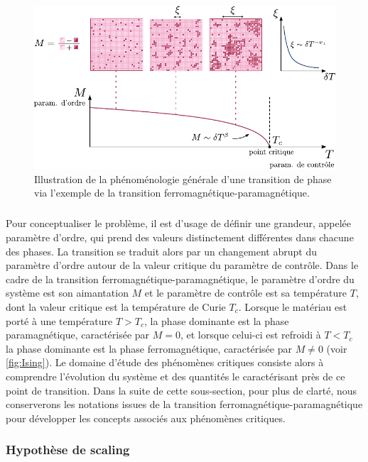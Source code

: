 \begin{figure}[h]
	\centering
	\includegraphics[width=\textwidth]{Chapitre1/Figures/PhenomenesCritiques/PT_conceptCorrLength_fuse.pdf}
	\caption{Illustration de la phénoménologie générale d'une transition de phase via l'exemple de la transition ferromagnétique-paramagnétique.}
	\label{fig:Ising}
\end{figure}

\subparagraph{}Pour conceptualiser le problème, il est d'usage de définir une grandeur, appelée paramètre d'ordre, qui prend des valeurs distinctement différentes dans chacune des phases. La transition se traduit alors par un changement abrupt du paramètre d'ordre autour de la valeur critique du paramètre de contrôle. Dans le cadre de la transition ferromagnétique-paramagnétique, le paramètre d'ordre du système est son aimantation $M$ et le paramètre de contrôle est sa température $T$, dont la valeur critique est la température de Curie $T_c$. Lorsque le matériau est porté à une température $T>T_c$, la phase dominante est la phase paramagnétique, caractérisée par $M=0$, et lorsque celui-ci est refroidi à $T<T_c$ la phase dominante est la phase ferromagnétique, caractérisée par $M\neq 0$ (voir \autoref{fig:Ising}). Le domaine d'étude des phénomènes critiques consiste alors à comprendre l'évolution du système et des quantités le caractérisant près de ce point de transition. Dans la suite de cette sous-section, pour plus de clarté, nous conserverons les notations issues de la transition ferromagnétique-paramagnétique pour développer les concepts associés aux phénomènes critiques.

\subsubsection{Hypothèse de scaling}

